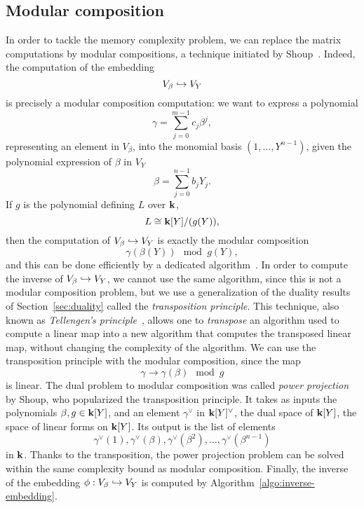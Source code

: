 \subsection{Modular composition}
\label{sec:modular-composition}

In order to tackle the memory complexity problem, we can replace the matrix
computations by modular compositions, a technique initiated by
Shoup~\cite{Shoup94, Shoup95, Shoup99}. Indeed, the computation of the embedding
\[
  V_\beta\hookrightarrow V_Y
\]
is precisely a modular composition computation: we want to express a polynomial
\[
  \gamma = \sum_{j=0}^{m-1}c_j\beta^j,
\]
representing an element in $V_\beta$, into the monomial basis $(1, \dots,
Y^{n-1})$, given the polynomial expression of $\beta$ in $V_Y$
\[
  \beta = \sum_{j=0}^{n-1}b_j Y_j.
\]
If $g$ is the polynomial defining $L$ over $\mathbf{k}$, \ie
\[
  L \cong \mathbf{k}[Y]/(g(Y)),
\]
then the computation of $V_\beta\hookrightarrow V_Y$ is exactly the modular composition
\[
  \gamma(\beta(Y))\mod g(Y),
\]
and this can be done efficiently by a dedicated algorithm~\cite{KU08}.
In order to compute the inverse of $V_\beta\hookrightarrow V_Y$, we cannot use the same
algorithm, since this is not a modular composition problem, but we use a
generalization of the duality results of Section~\ref{sec:duality} called the
\emph{transposition principle}. This technique, also known as \emph{Tellengen's
principle}~\cite{BLS03, DeFeo10, DS10}, allows one to \emph{transpose} an
algorithm used to compute a linear map into a new algorithm that computes the
transposed linear map, without changing the complexity of the algorithm. We can
use the transposition principle with the modular composition, since the map
\[
  \gamma\to\gamma(\beta)\mod g
\]
is linear. The dual problem to modular composition was called \emph{power
projection} by Shoup, who popularized the transposition principle. It takes as
inputs the polynomials $\beta,g\in\mathbf{k}[Y]$, and an element $\gamma^\vee$ in
$\mathbf{k}[Y]^\vee$, the dual space of $\mathbf{k}[Y]$, \ie the space of linear forms on
$\mathbf{k}[Y]$. Its output is the list of elements
\[
  \gamma^\vee(1),\gamma^\vee(\beta),\gamma^\vee(\beta^2), \dots, \gamma^\vee(\beta^{n-1})
\]
in $\mathbf{k}$. Thanks to the transposition, the power projection problem can be solved
within the same complexity bound as modular composition. Finally, the inverse of
the embedding $\phi:V_\beta\hookrightarrow V_Y$ is computed by
Algorithm~\ref{algo:inverse-embedding}.
